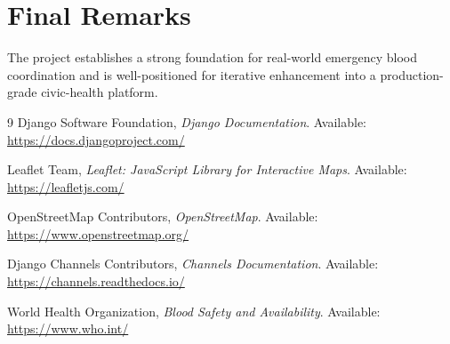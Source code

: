 \documentclass[12pt,a4paper]{report}
\begin{document}
\section{Final Remarks}
The project establishes a strong foundation for real-world emergency blood coordination and is well-positioned for iterative enhancement into a production-grade civic-health platform.

\begin{thebibliography}{9}
Django Software Foundation, \textit{Django Documentation}. Available: \url{https://docs.djangoproject.com/}

Leaflet Team, \textit{Leaflet: JavaScript Library for Interactive Maps}. Available: \url{https://leafletjs.com/}

OpenStreetMap Contributors, \textit{OpenStreetMap}. Available: \url{https://www.openstreetmap.org/}

Django Channels Contributors, \textit{Channels Documentation}. Available: \url{https://channels.readthedocs.io/}

World Health Organization, \textit{Blood Safety and Availability}. Available: \url{https://www.who.int/}
\end{thebibliography}
\end{document}
